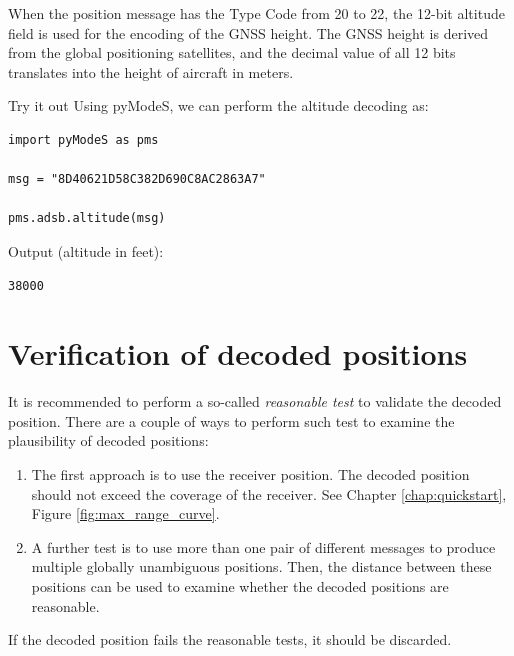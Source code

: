 When the position message has the Type Code from 20 to 22, the 12-bit altitude field is used for the encoding of the GNSS height. The GNSS height is derived from the global positioning satellites, and the decimal value of all 12 bits translates into the height of aircraft in meters.

\begin{notebox}{Try it out}
Using pyModeS, we can perform the altitude decoding as: 

\begin{verbatim}
import pyModeS as pms

msg = "8D40621D58C382D690C8AC2863A7"

pms.adsb.altitude(msg)
\end{verbatim}

Output (altitude in feet): 

\begin{verbatim}
38000
\end{verbatim}
\end{notebox}



\section{Verification of decoded positions}

It is recommended to perform a so-called \emph{reasonable test} to validate the decoded position. There are a couple of ways to perform such test to examine the plausibility of decoded positions:

\begin{enumerate}
  \item The first approach is to use the receiver position. The decoded position should not exceed the coverage of the receiver. See Chapter \ref{chap:quickstart}, Figure \ref{fig:max_range_curve}.

  \item A further test is to use more than one pair of different messages to produce multiple globally unambiguous positions. Then, the distance between these positions can be used to examine whether the decoded positions are reasonable.
\end{enumerate}

If the decoded position fails the reasonable tests, it should be discarded.
